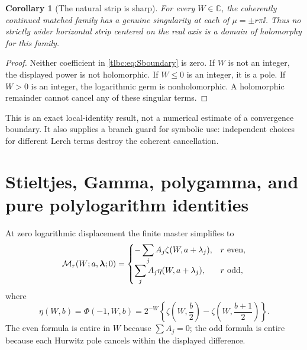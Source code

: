 \documentclass[11pt,letterpaper]{article}
\numberwithin{equation}{section}
\newtheorem{corollary}[theorem]{Corollary}
\theoremstyle{definition}\newtheorem{definition}[theorem]{Definition}
\theoremstyle{remark}\newtheorem{remark}[theorem]{Remark}
\newcommand{\C}{\mathbb C}\newcommand{\R}{\mathbb R}\newcommand{\Q}{\mathbb Q}\newcommand{\Z}{\mathbb Z}
\newcommand{\M}{\mathcal M}\newcommand{\T}{\mathcal T}\newcommand{\K}{\mathcal K}
\begin{document}
\begin{corollary}[The natural strip is sharp]\label{tlbc:cor:sharpstrip}
For every $W\in\C$, the coherently continued matched family has a genuine singularity at each of $\mu=\pm r\pi\ii$. Thus no strictly wider horizontal strip centered on the real axis is a domain of holomorphy for this family.
\end{corollary}
\begin{proof}
Neither coefficient in \eqref{tlbc:eq:Sboundary} is zero. If $W$ is not an integer, the displayed power is not holomorphic. If $W\le0$ is an integer, it is a pole. If $W>0$ is an integer, the logarithmic germ is nonholomorphic. A holomorphic remainder cannot cancel any of these singular terms.
\end{proof}
This is an exact local-identity result, not a numerical estimate of a convergence boundary. It also supplies a branch guard for symbolic use: independent choices for different Lerch terms destroy the coherent cancellation.

\section{Stieltjes, Gamma, polygamma, and pure polylogarithm identities}
\label{tlbc:sec:special}
At zero logarithmic displacement the finite master simplifies to
\begin{equation}\label{tlbc:eq:centralvalues}
 \M_r(W;a,\bl;0)=
 \begin{cases}
  -\displaystyle\sum_j A_j\zeta(W,a+\lambda_j),&r\text{ even},\\[3pt]
  \displaystyle\sum_j A_j\eta(W,a+\lambda_j),&r\text{ odd},
 \end{cases}
\end{equation}
where
\begin{equation}\label{tlbc:eq:eta}
 \eta(W,b)=\Phi(-1,W,b)
 =2^{-W}\left\{\zeta\left(W,\frac b2\right)
                    -\zeta\left(W,\frac{b+1}2\right)\right\}.
\end{equation}
The even formula is entire in $W$ because $\sum A_j=0$; the odd formula is entire because each Hurwitz pole cancels within the displayed difference.
\end{document}

